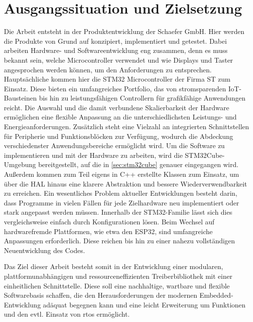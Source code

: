\section{Ausgangssituation und Zielsetzung}
Die Arbeit entsteht in der Produktentwicklung der Schaefer GmbH.
Hier werden die Produkte von Grund auf konzipiert, implementiert und getestet.
Dabei arbeiten Hardware- und Softwareentwicklung eng zusammen, denn es muss bekannt sein, welche Microcontroller verwendet und wie Displays und Taster angesprochen werden können, um den Anforderungen zu entsprechen.
Hauptsächliche kommen hier die STM32 Microcontroller der Firma ST zum Einsatz.
Diese bieten ein umfangreiches Portfolio, das von stromsparenden IoT-Bausteinen bis hin zu leistungsfähigen Controllern für grafikfähige Anwendungen reicht.
Die Auswahl und die damit verbundene Skalierbarkeit der Hardware ermöglichen eine flexible Anpassung an die unterschiedlichsten Leistungs- und Energieanforderungen.
Zusätzlich steht eine Vielzahl an integrierten Schnittstellen für Peripherie und Funktionsblöcken zur Verfügung, wodurch die Abdeckung verschiedenster Anwendungsbereiche ermöglicht wird.
Um die Software zu implementieren und mit der Hardware zu arbeiten, wird die STM32Cube-Umgebung bereitgestellt, auf die in \cref{sec:stm32cube} genauer eingegangen wird.
Außerdem kommen zum Teil eigens in C++ erstellte Klassen zum Einsatz, um über die HAL hinaus eine klarere Abstraktion und bessere Wiederverwendbarkeit zu erreichen.
Ein wesentliches Problem aktueller Entwicklungen besteht darin, dass Programme in vielen Fällen für jede Zielhardware neu implementiert oder stark angepasst werden müssen.
Innerhalb der STM32-Familie lässt sich dies vergleichsweise einfach durch Konfigurationen lösen. 
Beim Wechsel auf hardwarefremde Plattformen, wie etwa den ESP32, sind umfangreiche Anpassungen erforderlich. 
Diese reichen bis hin zu einer nahezu vollständigen Neuentwicklung des Codes.

Das Ziel dieser Arbeit besteht somit in der Entwicklung einer modularen, plattformunabhängigen und ressourceneffizienten Treiberbibliothek mit einer einheitlichen Schnittstelle. 
Diese soll eine nachhaltige, wartbare und flexible Softwarebasis schaffen, die den Herausforderungen der modernen Embedded-Entwicklung adäquat begegnen kann und eine  leicht Erweiterung um Funktionen und den evtl. Einsatz von \gls{rtos} ermöglicht.




